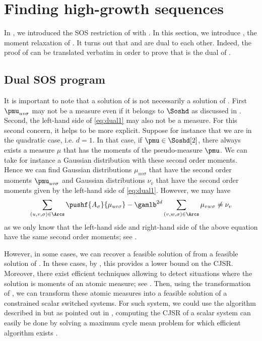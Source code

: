 \section{Finding high-growth sequences}
\label{sec:dualalgo}
In , we introduced the SOS restriction of  with .
In this section, we introduce , the moment relaxation of .
It turns out that  and  are dual to each other.
Indeed, the proof of  can be translated verbatim in order to prove that  is the dual of .


\subsection{Dual SOS program}
\label{sec:dual}









It is important to note that a solution of  is not necessarily a solution of .
First $\pmu_{uv\sigma}$ may not be a measure even if it belongs to $\Soshd$ as discussed in .
Second, the left-hand side of \eqref{eq:dual1} may also not be a measure.
For this second concern, it helps to be more explicit.
Suppose for instance that we are in the quadratic case, i.e. $d = 1$.
In that case, if $\pmu \in \Soshd[2]$, there always exists a measure $\mu$ that has the moments of the pseudo-measure $\pmu$.
We can take for instance a Gaussian distribution with these second order moments.
Hence we can find Gaussian distributions $\mu_{uv\sigma}$ that have the second order moments $\pmu_{uv\sigma}$
and Gaussian distributions $\nu_v$ that have the second order moments given by the left-hand side of \eqref{eq:dual1}.
However, we may have
\[ \sum_{(u,v,\sigma) \in \Arcs} \pushf{A_\sigma}{\mu_{uv\sigma}} - \gamlb^{2d} \sum_{(v,w,\sigma) \in \Arcs} \mu_{vw\sigma} \neq \nu_v \]
as we only know that the left-hand side and right-hand side of the above equation have the same second order moments;
see .

However, in some cases, we can recover a feasible solution of  from a feasible solution of .
In these cases, by , this provides a lower bound on the CJSR.
Moreover, there exist efficient techniques allowing to detect situations where the solution is moments of an atomic measure; see \cite{henrion2005detecting, laurent2009sums}.
Then, using the transformation of , we can transform
these atomic measures into a feasible solution of a constrained scalar switched systems.
For such system, we could use the algorithm described in  but as pointed out in \cite{ahmadi2012joint},
computing the CJSR of a scalar system can easily be done by solving a maximum cycle mean problem for which efficient algorithm exists \cite{karp1978characterization}.


